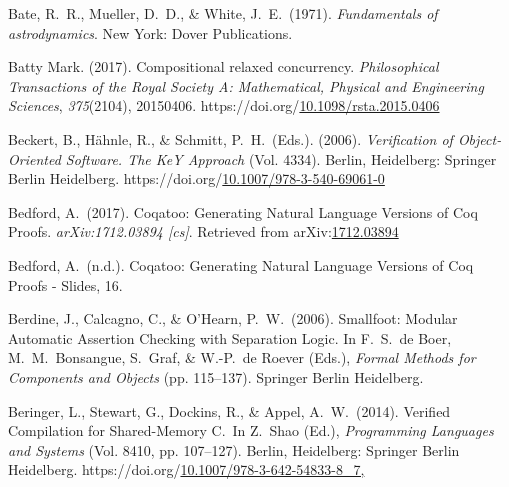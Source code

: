 \documentclass[12pt,twoside]{article}
\begin{document}
{\begin{thebibliography}{222}
Bate, R.~R., Mueller, D.~D., \& White, J.~E.~(1971). \emph{Fundamentals of astrodynamics}. New York: Dover Publications.\label{bate_fundamentals_1971}%

Batty Mark. (2017). Compositional relaxed concurrency. \emph{Philosophical Transactions of the Royal Society A: Mathematical, Physical and Engineering Sciences}, \emph{375}(2104), 20150406. https://doi.org/\href{https://dx.doi.org/10.1098/rsta.2015.0406}{10.1098/rsta.2015.0406}\label{batty_mark_compositional_2017}%

Beckert, B., Hähnle, R., \& Schmitt, P.~H.~(Eds.). (2006). \emph{Verification of Object-Oriented Software. The KeY Approach} (Vol. 4334). Berlin, Heidelberg: Springer Berlin Heidelberg. https://doi.org/\href{https://dx.doi.org/10.1007/978-3-540-69061-0}{10.1007/978-3-540-69061-0}\label{beckert_verification_2006}%

\mdbibitemlabel{[Bedford, 2017]}Bedford, A.~(2017). Coqatoo: Generating Natural Language Versions of Coq Proofs. \emph{arXiv:1712.03894 {}[cs]}. Retrieved from arXiv:\href{http://arxiv.org/abs/1712.03894}{1712.03894}\label{bedford_coqatoo:_2017}%

\mdbibitemlabel{[Bedford, n.d.]}Bedford, A.~(n.d.). Coqatoo: Generating Natural Language Versions of Coq Proofs - Slides, 16.\label{bedford_coqatoo:_nodate}%

Berdine, J., Calcagno, C., \& O’Hearn, P.~W.~(2006). Smallfoot: Modular Automatic Assertion Checking with Separation Logic. In F.~S.~de Boer, M.~M.~Bonsangue, S.~Graf, \& W.-P.~de Roever (Eds.), \emph{Formal Methods for Components and Objects} (pp. 115–137). Springer Berlin Heidelberg.\label{berdine_smallfoot:_2006}%

Beringer, L., Stewart, G., Dockins, R., \& Appel, A.~W.~(2014). Verified Compilation for Shared-Memory C.~In Z.~Shao (Ed.), \emph{Programming Languages and Systems} (Vol. 8410, pp. 107–127). Berlin, Heidelberg: Springer Berlin Heidelberg. https://doi.org/\href{https://dx.doi.org/10.1007/978-3-642-54833-8_7,}{10.1007/978-3-642-54833-8\_7,}\label{hutchison_verified_2014}%


\end{thebibliography}}
\end{document}

